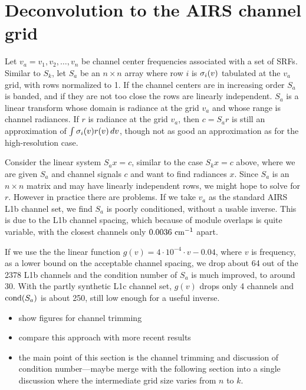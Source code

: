 \documentclass[11pt]{article}
\begin{document}
\section{Deconvolution to the AIRS channel grid}

Let $v_a = v_1,v_2,\ldots,v_n$ be channel center frequencies
associated with a set of SRFs.  Similar to $S_k$, let $S_a$ be an
$n\times n$ array where row $i$ is $\sigma_i(v)$ tabulated at the $v_a$
grid, with rows normalized to 1.  If the channel centers are in
increasing order $S_a$ is banded, and if they are not too close the
rows are linearly independent.  $S_a$ is a linear transform whose
domain is radiance at the grid $v_a$ and whose range is channel
radiances.  If $r$ is radiance at the grid $v_a$, then $c = S_a r$ is
still an approximation of $\int\sigma_i(v)r(v)\,dv$, though not as good
an approximation as for the high-resolution case.

Consider the linear system $S_a x = c$, similar to the case $S_k x =
c$ above, where we are given $S_a$ and channel signals $c$ and want
to find radiances $x$.  Since $S_a$ is an $n \times n$ matrix and
may have linearly independent rows, we might hope to solve for $r$.
However in practice there are problems.  If we take $v_a$ as the
standard AIRS L1b channel set, we find $S_a$ is poorly conditioned,
without a usable inverse.  This is due to the L1b channel spacing,
which because of module overlaps is quite variable, with the closest
channels only $0.0036\ \wnum$ apart.

If we use the the linear function $g(v) = 4\cdot 10^{-4} \cdot v -
0.04$, where $v$ is frequency, as a lower bound on the acceptable
channel spacing, we drop about 64 out of the 2378 L1b channels and
the condition number of $S_a$ is much improved, to around 30.  With
the partly synthetic L1c channel set, $g(v)$ drops only 4 channels
and $\hbox{cond}(S_a)$ is about 250, still low enough for a useful
inverse.

\begin{itemize}
  \item show figures for channel trimming
  \item compare this approach with more recent results
  \item the main point of this section is the channel trimming and
    discussion of condition number---maybe merge with the following
    section into a single discussion where the intermediate grid
    size varies from $n$ to $k$.
\end{itemize}
\end{document}
